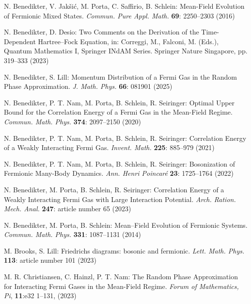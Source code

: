\documentclass[12pt,a4paper]{article}
\numberwithin{equation}{section}
\newcommand{\1}{\mathbb{I}}
\theoremstyle{plain}
\theoremstyle{definition}
\theoremstyle{remark}
\theoremstyle{plain}
\theoremstyle{definition}
\theoremstyle{remark}
\begin{document}
\begin{thebibliography}{29}
N. Benedikter, V. Jakšić, M. Porta, C. Saffirio, B. Schlein:
	Mean-Field Evolution of Fermionic Mixed States.
	\emph{Commun. Pure Appl. Math.} \textbf{69}: 2250--2303 (2016)

N. Benedikter, D. Desio:
	Two Comments on the Derivation of the Time-Dependent Hartree–Fock Equation, in: Correggi, M., Falconi, M. (Eds.), Quantum Mathematics I, Springer INdAM Series. Springer Nature Singapore, pp. 319--333 (2023)

N. Benedikter, S. Lill:
	Momentum Distribution of a Fermi Gas in the Random Phase Approximation.
	\emph{J. Math. Phys.} \textbf{66}: 081901 (2025)

N. Benedikter, P. T. Nam, M. Porta, B. Schlein, R. Seiringer:
	Optimal Upper Bound for the Correlation Energy of a Fermi Gas in the Mean-Field Regime.
	\emph{Commun. Math. Phys.} \textbf{374}: 2097--2150 (2020)

N. Benedikter, P. T. Nam, M. Porta, B. Schlein, R. Seiringer:
	Correlation Energy of a Weakly Interacting Fermi Gas.
	\emph{Invent. Math.} \textbf{225}: 885--979 (2021)
	
N. Benedikter, P. T. Nam, M. Porta, B. Schlein, R. Seiringer:
	Bosonization of Fermionic Many-Body Dynamics.
	\emph{Ann. Henri Poincar\'e} \textbf{23}: 1725--1764 (2022)

N. Benedikter, M. Porta, B. Schlein, R. Seiringer:
	Correlation Energy of a Weakly Interacting Fermi Gas with Large Interaction Potential.
	\emph{Arch. Ration. Mech. Anal.} \textbf{247}: article number 65 (2023)

N. Benedikter, M. Porta, B. Schlein:
	Mean–Field Evolution of Fermionic Systems.
	\emph{Commun. Math. Phys.} \textbf{331}: 1087--1131 (2014)

M. Brooks, S. Lill:
	Friedrichs diagrams: bosonic and fermionic.
	\emph{Lett. Math. Phys.} \textbf{113}: article number 101 (2023)



M. R. Christiansen, C. Hainzl, P. T. Nam:
	The Random Phase Approximation for Interacting Fermi Gases in the Mean-Field Regime.
	\emph{Forum of Mathematics, Pi}, \textbf{11}:e32 1--131, (2023)


\end{thebibliography}
\end{document}
